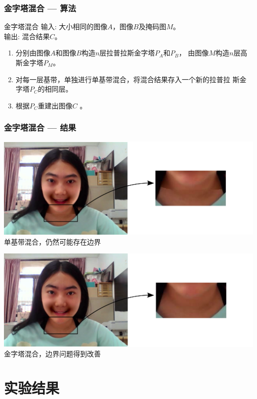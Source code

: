 \documentclass[xcolor=svgnames,serif,table]{beamer}
\begin{document}
\begin{frame}
  \frametitle{金字塔混合 --- 算法}
  \begin{exampleblock}{金字塔混合}
    \textcolor{black!60!green}{输入}: 大小相同的图像$A$，图像$B$及掩码图$M$。\\
    \textcolor{black!60!green}{输出}: 混合结果$C$。
    \begin{enumerate}[(S1)]
    \item 分别由图像$A$和图像$B$构造$n$层拉普拉斯金字塔$P_A$和$P_B$，
    由图像$M$构造$n$层高斯金字塔$P_M$。
    \item 对每一层基带，单独进行单基带混合，将混合结果存入一个新的拉普拉
    斯金字塔$P_C$的相同层。
    \item 根据$P_C$重建出图像$C$ 。
    \end{enumerate}
  \end{exampleblock}
\end{frame}

\begin{frame}
  \frametitle{金字塔混合 --- 结果}
  \scriptsize
  \begin{center}
    \includegraphics[width=.6\textwidth]{single-band-blend-asy.pdf}\\
    单基带混合，仍然可能存在边界

    \medskip
    \includegraphics[width=.6\textwidth]{pyramid-blend-asy.pdf}\\
    金字塔混合，边界问题得到改善
  \end{center}
\end{frame}

\section{实验结果}
\end{document}
